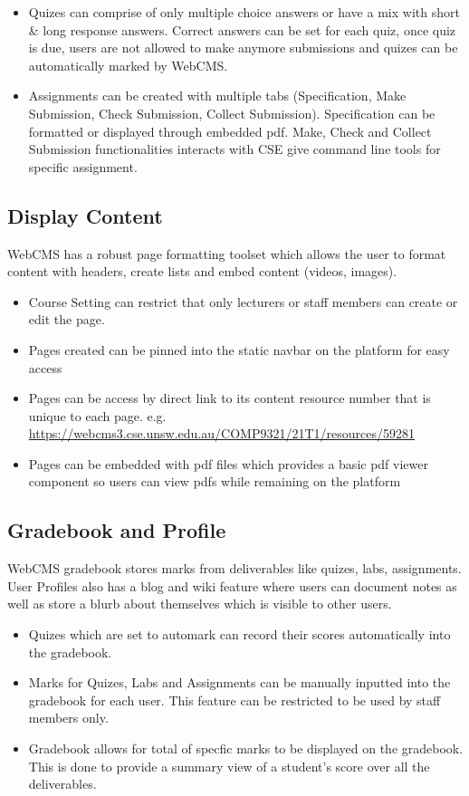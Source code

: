 \begin{itemize}
	\item Quizes can comprise of only multiple choice answers or have a mix with short \& long response answers. Correct answers can be set for each quiz, once quiz is due, users are not allowed to make anymore submissions and quizes can be automatically marked by WebCMS.
	\item Assignments can be created with multiple tabs (Specification, Make Submission, Check Submission, Collect Submission). Specification can be formatted or displayed through embedded pdf. Make, Check and Collect Submission functionalities interacts with CSE give command line tools for specific assignment.
\end{itemize}

\subsection{Display Content}
WebCMS has a robust page formatting toolset which allows the user to format content with headers, create lists and embed content (videos, images).

\begin{itemize}
	\item Course Setting can restrict that only lecturers or staff members can create or edit the page.
	\item Pages created can be pinned into the static navbar on the platform for easy access
	\item Pages can be access by direct link to its content resource number that is unique to each page. e.g. \url{https://webcms3.cse.unsw.edu.au/COMP9321/21T1/resources/59281}
	\item Pages can be embedded with pdf files which provides a basic pdf viewer component so users can view pdfs while remaining on the platform
\end{itemize}

\subsection{Gradebook and Profile}
WebCMS gradebook stores marks from deliverables like quizes, labs, assignments. User Profiles also has a blog and wiki feature where users can document notes as well as store a blurb about themselves which is visible to other users.

\begin{itemize}
	\item Quizes which are set to automark can record their scores automatically into the gradebook.
	\item Marks for Quizes, Labs and Assignments can be manually inputted into the gradebook for each user. This feature can be restricted to be used by staff members only.
	\item Gradebook allows for total of specfic marks to be displayed on the gradebook. This is done to provide a summary view of a student's score over all the deliverables.
\end{itemize}

